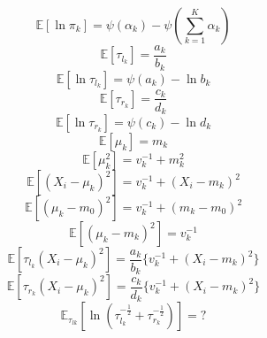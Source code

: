 \documentclass[runningheads]{llncs}
\begin{document}
\begin{equation}
   \mathbb{E}[\ln \pi_k] = \psi(\alpha_k) -  \psi(\sum_{k=1}^{K}\alpha_k)
\end{equation}
\begin{equation}
   \mathbb{E}[\tau_{l_k}] = \frac{a_k}{b_k}
\end{equation}
\begin{equation}
   \mathbb{E}[\ln \tau_{l_k}] = \psi(a_k) - \ln b_k
\end{equation}
\begin{equation}
   \mathbb{E}[\tau_{r_k}] = \frac{c_k}{d_k}
\end{equation}
\begin{equation}
   \mathbb{E}[\ln \tau_{r_k}] = \psi(c_k) - \ln d_k
\end{equation}
\begin{equation}
   \mathbb{E}[\mu_k] = m_k
\end{equation}
\begin{equation}
   \mathbb{E}[\mu_k^2] = v_k^{-1} + m_k^2
\end{equation}
\begin{equation}
   \mathbb{E}[(X_i-\mu_k)^2] = v_k^{-1} + (X_i - m_k)^2
\end{equation}
\begin{equation}
   \mathbb{E}[(\mu_k-m_0)^2] = v_k^{-1} + (m_k - m_0)^2
\end{equation}
\begin{equation}
   \mathbb{E}[(\mu_k-m_k)^2] = v_k^{-1}
\end{equation}
\begin{equation}
   \mathbb{E}[\tau_{l_k}(X_i-\mu_k)^2] = \frac{a_k}{b_k}\{v_k^{-1} + (X_i - m_k)^2\}
\end{equation}
\begin{equation}
   \mathbb{E}[\tau_{r_k}(X_i-\mu_k)^2] = \frac{c_k}{d_k}\{v_k^{-1} + (X_i - m_k)^2\}
\end{equation}
\begin{equation}
\mathbb{E}_{\tau_{lk}}[\ln(\tau_{l_k}^{-\frac{1}{2}} +\tau_{r_k}^{-\frac{1}{2}})] = ?
\end{equation}
\end{document}
